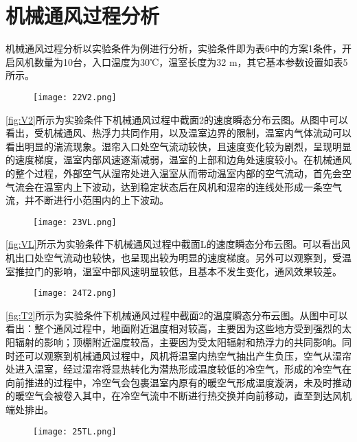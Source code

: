 \section{机械通风过程分析}
机械通风过程分析以实验条件为例进行分析，实验条件即为表6中的方案1条件，开启风机数量为10台，入口温度为30℃，温室长度为32 m，其它基本参数设置如表5所示。
		 \begin{figure}[!htp]
  			\centering
 			\texttt{[image: 22V2.png]}
		\end{figure}
\ref{fig:V2}所示为实验条件下机械通风过程中截面2的速度瞬态分布云图。从图中可以看出，受机械通风、热浮力共同作用，以及温室边界的限制，温室内气体流动可以看出明显的湍流现象。湿帘入口处空气流动较快，且速度变化较为剧烈，呈现明显的速度梯度，温室内部风速逐渐减弱，温室的上部和边角处速度较小。在机械通风的整个过程，外部空气从湿帘处进入温室从而带动温室内部的空气流动，首先会空气流会在温室内上下波动，达到稳定状态后在风机和湿帘的连线处形成一条空气流，并不断进行小范围内的上下波动。
		 \begin{figure}[!htp]
  			\centering
 			\texttt{[image: 23VL.png]}
		\end{figure}
\ref{fig:VL}所示为实验条件下机械通风过程中截面L的速度瞬态分布云图。可以看出风机出口处空气流动也较快，也呈现出较为明显的速度梯度。另外可以观察到，受温室推拉门的影响，温室中部风速明显较低，且基本不发生变化，通风效果较差。
	\begin{figure}[!htp]
  			\centering
 			\texttt{[image: 24T2.png]}
		\end{figure}
\ref{fig:T2}所示为实验条件下机械通风过程中截面2的温度瞬态分布云图。从图中可以看出：整个通风过程中，地面附近温度相对较高，主要因为这些地方受到强烈的太阳辐射的影响；顶棚附近温度较高，主要因为受太阳辐射和热浮力的共同影响。同时还可以观察到机械通风过程中，风机将温室内热空气抽出产生负压，空气从湿帘处进入温室，经过湿帘将显热转化为潜热形成温度较低的冷空气，形成的冷空气在向前推进的过程中，冷空气会包裹温室内原有的暖空气形成温度漩涡，未及时推动的暖空气会被卷入其中，在冷空气流中不断进行热交换并向前移动，直至到达风机端处排出。
	\begin{figure}[!htp]
  			\centering
 			\texttt{[image: 25TL.png]}
		\end{figure}
